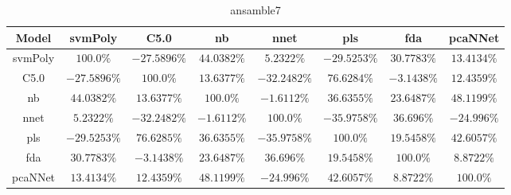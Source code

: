 \begin{table}[!ht]
	\centering
	\begin{tabular}{|c|c|c|c|c|c|c|c|}
		\hline
		Model & svmPoly & C5.0 & nb & nnet & pls & fda & pcaNNet \\ \hline
		svmPoly & $100.0\%$ & $-27.5896\%$ & $44.0382\%$ & $5.2322\%$ & $-29.5253\%$ & $30.7783\%$ & $13.4134\%$ \\ \hline
		C5.0 & $-27.5896\%$ & $100.0\%$ & $13.6377\%$ & $-32.2482\%$ & $76.6284\%$ & $-3.1438\%$ & $12.4359\%$ \\ \hline
		nb & $44.0382\%$ & $13.6377\%$ & $100.0\%$ & $-1.6112\%$ & $36.6355\%$ & $23.6487\%$ & $48.1199\%$ \\ \hline
		nnet & $5.2322\%$ & $-32.2482\%$ & $-1.6112\%$ & $100.0\%$ & $-35.9758\%$ & $36.696\%$ & $-24.996\%$ \\ \hline
		pls & $-29.5253\%$ & $76.6285\%$ & $36.6355\%$ & $-35.9758\%$ & $100.0\%$ & $19.5458\%$ & $42.6057\%$ \\ \hline
		fda & $30.7783\%$ & $-3.1438\%$ & $23.6487\%$ & $36.696\%$ & $19.5458\%$ & $100.0\%$ & $8.8722\%$ \\ \hline
		pcaNNet & $13.4134\%$ & $12.4359\%$ & $48.1199\%$ & $-24.996\%$ & $42.6057\%$ & $8.8722\%$ & $100.0\%$ \\ \hline
	\end{tabular}
	\caption{ansamble7}
	\label{tab:ansamble7}
\end{table}

